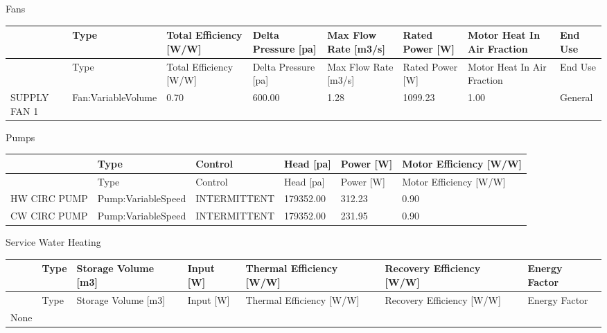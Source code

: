 Fans

\begin{longtable}[c]{p{0.75in}p{0.75in}p{0.75in}p{0.75in}p{0.75in}p{0.75in}p{0.75in}p{0.75in}}
\toprule 
~ & Type & Total Efficiency [W/W] & Delta Pressure [pa] & Max Flow Rate [m3/s] & Rated Power [W] & Motor Heat In Air Fraction & End Use \tabularnewline
\midrule
\endfirsthead

\toprule 
~ & Type & Total Efficiency [W/W] & Delta Pressure [pa] & Max Flow Rate [m3/s] & Rated Power [W] & Motor Heat In Air Fraction & End Use \tabularnewline
\midrule
\endhead

SUPPLY FAN 1 & Fan:VariableVolume & 0.70 & 600.00 & 1.28 & 1099.23 & 1.00 & General \tabularnewline
\bottomrule
\end{longtable}

Pumps

\begin{longtable}[c]{p{1.0in}p{1.0in}p{1.0in}p{1.0in}p{1.0in}p{1.0in}}
\toprule 
~ & Type & Control & Head [pa] & Power [W] & Motor Efficiency [W/W] \tabularnewline
\midrule
\endfirsthead

\toprule 
~ & Type & Control & Head [pa] & Power [W] & Motor Efficiency [W/W] \tabularnewline
\midrule
\endhead

HW CIRC PUMP & Pump:VariableSpeed & INTERMITTENT & 179352.00 & 312.23 & 0.90 \tabularnewline
CW CIRC PUMP & Pump:VariableSpeed & INTERMITTENT & 179352.00 & 231.95 & 0.90 \tabularnewline
\bottomrule
\end{longtable}

Service Water Heating

\begin{longtable}[c]{p{0.85in}p{0.85in}p{0.85in}p{0.85in}p{0.85in}p{0.85in}p{0.85in}}
\toprule 
~ & Type & Storage Volume [m3] & Input [W] & Thermal Efficiency [W/W] & Recovery Efficiency [W/W] & Energy Factor \tabularnewline
\midrule
\endfirsthead

\toprule 
~ & Type & Storage Volume [m3] & Input [W] & Thermal Efficiency [W/W] & Recovery Efficiency [W/W] & Energy Factor \tabularnewline
\midrule
\endhead

None & ~ & ~ & ~ & ~ & ~ & ~ \tabularnewline
\bottomrule
\end{longtable}
